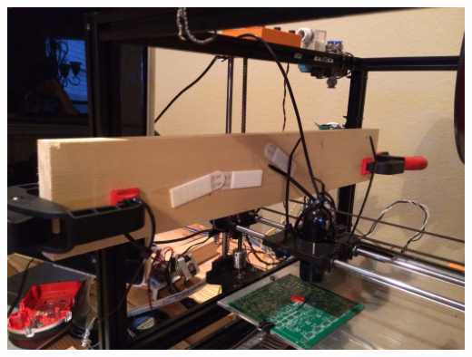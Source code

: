\documentclass[12pt]{article}
\begin{document}
\newpage
\includegraphics[scale=0.1]{images/volume_analysis_setup/IMG_0614.JPG}
\newpage
\end{document}
